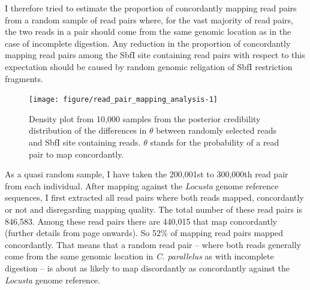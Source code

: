 \documentclass[a4paper,12pt,times,print,index,custombib,custommargin]{PhDThesisPSnPDF}\usepackage[]{graphicx}\usepackage[]{color}
\newenvironment{knitrout}{}{} %
\begin{document}
%
%

I therefore tried to estimate the proportion of \gls{concordant}ly mapping read pairs from a random sample of read pairs where, for the vast majority of read pairs, the two reads in a pair should come from the same genomic location as in the case of incomplete digestion. Any reduction in the proportion of \gls{concordant}ly mapping read pairs among the SbfI site containing read pairs with respect to this expectation should be caused by random genomic religation of SbfI restriction fragments. 
%
\begin{figure}
\begin{knitrout}
\color{fgcolor}

{\centering \texttt{[image: figure/read\_pair\_mapping\_analysis-1]} 

}



\end{knitrout}
\caption{Density plot from 10,000 samples from the posterior credibility distribution of the differences in $\theta$ between randomly selected reads and SbfI site containing reads. $\theta$ stands for the probability of a read pair to map concordantly.}
\label{fig:read_pair_mapping_analysis}
\end{figure}
%

As a quasi random sample, I have taken the 200,001st to 300,000th read pair from each individual.
After mapping against the \textit{Locusta} genome reference sequences, I first extracted all read pairs where both reads mapped, \gls{concordant}ly or not and disregarding mapping quality. The total number of these read pairs is 846,583. Among these read pairs there are 440,015 that map \gls{concordant}ly (further details from page \pageref{read_pair_mapping_analysis} onwards). So 52\% of mapping read pairs mapped concordantly. That means that a random read pair -- where both reads generally come from the same genomic location in \textit{C. parallelus} as with incomplete digestion -- is about as likely to map \gls{discordant}ly as \gls{concordant}ly against the \textit{Locusta} genome reference.
\end{document}

